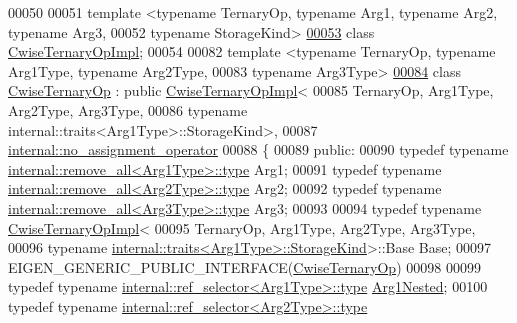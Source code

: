 \begin{DoxyCode}
00050 
00051 \textcolor{keyword}{template} <\textcolor{keyword}{typename} TernaryOp, \textcolor{keyword}{typename} Arg1, \textcolor{keyword}{typename} Arg2, \textcolor{keyword}{typename} Arg3,
00052           \textcolor{keyword}{typename} StorageKind>
\hyperlink{class_eigen_1_1_cwise_ternary_op_impl}{00053} \textcolor{keyword}{class }\hyperlink{class_eigen_1_1_cwise_ternary_op_impl}{CwiseTernaryOpImpl};
00054 
00082 \textcolor{keyword}{template} <\textcolor{keyword}{typename} TernaryOp, \textcolor{keyword}{typename} Arg1Type, \textcolor{keyword}{typename} Arg2Type,
00083           \textcolor{keyword}{typename} Arg3Type>
\hyperlink{group___core___module}{00084} \textcolor{keyword}{class }\hyperlink{group___core___module_class_eigen_1_1_cwise_ternary_op}{CwiseTernaryOp} : \textcolor{keyword}{public} \hyperlink{class_eigen_1_1_cwise_ternary_op_impl}{CwiseTernaryOpImpl}<
00085                            TernaryOp, Arg1Type, Arg2Type, Arg3Type,
00086                            typename internal::traits<Arg1Type>::StorageKind>,
00087                        \hyperlink{class_eigen_1_1internal_1_1no__assignment__operator}{internal::no\_assignment\_operator}
00088 \{
00089  \textcolor{keyword}{public}:
00090   \textcolor{keyword}{typedef} \textcolor{keyword}{typename} \hyperlink{group___sparse_core___module}{internal::remove\_all<Arg1Type>::type} Arg1;
00091   \textcolor{keyword}{typedef} \textcolor{keyword}{typename} \hyperlink{group___sparse_core___module}{internal::remove\_all<Arg2Type>::type} Arg2;
00092   \textcolor{keyword}{typedef} \textcolor{keyword}{typename} \hyperlink{group___sparse_core___module}{internal::remove\_all<Arg3Type>::type} Arg3;
00093 
00094   \textcolor{keyword}{typedef} \textcolor{keyword}{typename} \hyperlink{class_eigen_1_1_cwise_ternary_op_impl}{CwiseTernaryOpImpl}<
00095       TernaryOp, Arg1Type, Arg2Type, Arg3Type,
00096       \textcolor{keyword}{typename} \hyperlink{struct_eigen_1_1internal_1_1traits}{internal::traits<Arg1Type>::StorageKind}>::Base Base;
00097   EIGEN\_GENERIC\_PUBLIC\_INTERFACE(\hyperlink{group___core___module_class_eigen_1_1_cwise_ternary_op}{CwiseTernaryOp})
00098 
00099   \textcolor{keyword}{typedef} \textcolor{keyword}{typename} \hyperlink{class_eigen_1_1internal_1_1_tensor_lazy_evaluator_writable}{internal::ref\_selector<Arg1Type>::type} 
      \hyperlink{class_eigen_1_1internal_1_1_tensor_lazy_evaluator_writable}{Arg1Nested};
00100   \textcolor{keyword}{typedef} \textcolor{keyword}{typename} \hyperlink{class_eigen_1_1internal_1_1_tensor_lazy_evaluator_writable}{internal::ref\_selector<Arg2Type>::type} 

\end{DoxyCode}
